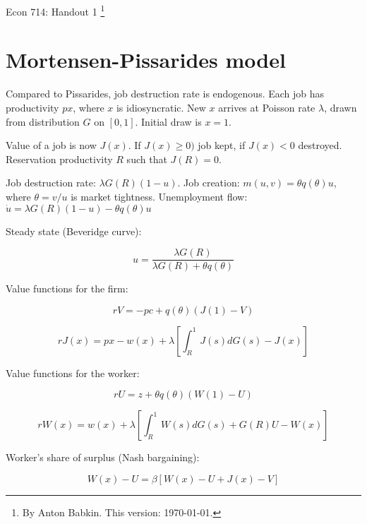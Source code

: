 \documentclass{article}
\title{Econ 714: Handout 1 \iftoggle{sol}{- Solution}{}}
\author{Anton Babkin}
\newcommand{\sol}[1]{\iftoggle{sol}{{\color{blue} #1 }}{}}
\begin{document}
{\Large Econ 714: Handout 1 \sol{- Solution}\footnote{By Anton Babkin. This version: \today.}}

\section{Mortensen-Pissarides model}

Compared to Pissarides, job destruction rate is endogenous. Each job
has productivity $px$, where $x$ is idiosyncratic. New $x$ arrives at
Poisson rate $\lambda$, drawn from distribution $G$ on
$[0,1]$. Initial draw is $x=1$.

Value of a job is now $J(x)$. If $J(x) \ge 0)$ job kept, if $J(x)<0$
destroyed. Reservation productivity $R$ such that $J(R)=0$.

Job destruction rate: $\lambda G(R)(1-u)$. Job creation:
$m(u,v)=\theta q(\theta)u$, where $\theta=v/u$ is market tightness. Unemployment flow: 
$\dot{u} = \lambda G(R)(1-u) - \theta q(\theta)u$

Steady state (Beveridge curve):

\begin{equation}
  \label{eq:bc}
  \tag{BC}
  u = \frac{\lambda G(R)}{\lambda G(R)+\theta q(\theta)}
\end{equation}

Value functions for the firm:

\begin{equation}
  \label{eq:fv}
  \tag{FV}
  rV=-pc+q(\theta)(J(1)-V)
\end{equation}

\begin{equation}
  \label{eq:fj}
  \tag{FJ}
  rJ(x)=px-w(x)+\lambda\left[\int_R^1J(s)dG(s)-J(x)\right]
\end{equation}

Value functions for the worker:

\begin{equation}
  \label{eq:wu}
  \tag{WU}
  rU=z + \theta q(\theta)(W(1)-U)
\end{equation}

\begin{equation}
  \label{eq:ww}
  \tag{WW}
  rW(x)=w(x)+\lambda\left[\int_R^1W(s)dG(s)+G(R)U-W(x)\right]
\end{equation}

Worker's share of surplus (Nash bargaining):

\begin{equation}
  \label{eq:nb}
  \tag{NB}
  W(x)-U=\beta[W(x)-U+J(x)-V]
\end{equation}
\end{document}
